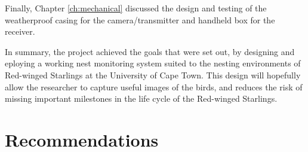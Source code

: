 \documentclass[class=report,11pt,crop=false]{standalone}
\begin{document}
Finally, Chapter \ref{ch:mechanical} discussed the design and testing of the weatherproof casing for the camera/transmitter and handheld box for the receiver. 

In summary, the project achieved the goals that were set out, by designing and eploying a working nest monitoring system suited to the nesting environments of Red-winged Starlings at the University of Cape Town. This design will hopefully allow the researcher to capture useful images of the birds, and reduces the risk of missing important milestones in the life cycle of the Red-winged Starlings. 

\chapter{Recommendations}


\ifstandalone

\printnoidxglossary[type=\acronymtype,nonumberlist]
\fi
\end{document}
